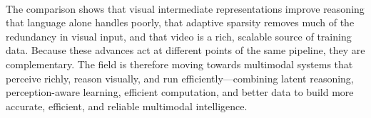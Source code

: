 \documentclass[12pt,a4paper,final]{extreport}
\begin{document}
\paragraph{} The comparison shows that visual intermediate representations improve reasoning that language alone handles poorly, that adaptive sparsity removes much of the redundancy in visual input, and that video is a rich, scalable source of training data. Because these advances act at different points of the same pipeline, they are complementary. The field is therefore moving towards multimodal systems that perceive richly, reason visually, and run efficiently---combining latent reasoning, perception-aware learning, efficient computation, and better data to build more accurate, efficient, and reliable multimodal intelligence.

\begingroup
{}
\end{document}
